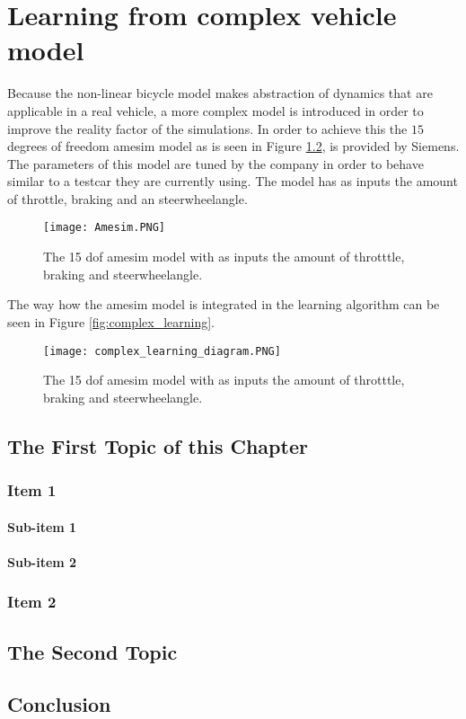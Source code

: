 \chapter{Learning from complex vehicle model}
\label{cha:Tracking_MPC}


Because the non-linear bicycle model makes abstraction of dynamics that are applicable in a real vehicle, a more complex model is introduced in order to improve the reality factor of the simulations. In order to achieve this the $15$ degrees of freedom amesim model as is seen in Figure \ref{fig:Amesim}, is provided by Siemens. The parameters of this model are tuned by the company in order to behave similar to a testcar they are currently using. The model has as inputs the amount of throttle, braking and an steerwheelangle.

\begin{figure}[h!]
	\centering
	\texttt{[image: Amesim.PNG]}
	\label{fig:Amesim}
	\caption{The 15 dof amesim model with as inputs the amount of throtttle, braking and steerwheelangle.}	
\end{figure}


The way how the amesim model is integrated in the learning algorithm can be seen in Figure \ref{fig:complex_learning}. 

\begin{figure}[h!]
	\centering
	\texttt{[image: complex\_learning\_diagram.PNG]}
	\label{fig:Amesim}
	\caption{The 15 dof amesim model with as inputs the amount of throtttle, braking and steerwheelangle.}	
\end{figure}
 
\section{The First Topic of this Chapter}
\subsection{Item 1}
\subsubsection{Sub-item 1}


\subsubsection{Sub-item 2}


\subsection{Item 2}


\section{The Second Topic}


\section{Conclusion}

